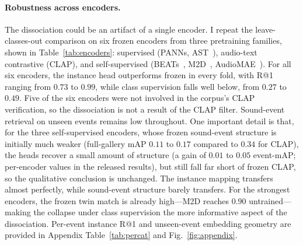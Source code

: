 \documentclass{article}
\begin{document}
\paragraph{Robustness across encoders.} The dissociation could be an artifact of a single encoder. I repeat the leave-classes-out comparison on six frozen encoders from three pretraining families, shown in Table~\ref{tab:encoders}: supervised (PANNs, AST~\citep{gong2021ast}), audio-text contrastive (CLAP), and self-supervised (BEATs~\citep{chen2023beats}, M2D~\citep{niizumi2024m2d}, AudioMAE~\citep{huang2022audiomae}). For all six encoders, the instance head outperforms frozen in every fold, with R@1 ranging from $0.73$ to $0.99$, while class supervision falls well below, from $0.27$ to $0.49$. Five of the six encoders were not involved in the corpus's CLAP verification, so the dissociation is not a result of the CLAP filter. Sound-event retrieval on unseen events remains low throughout. One important detail is that, for the three self-supervised encoders, whose frozen sound-event structure is initially much weaker (full-gallery mAP $0.11$ to $0.17$ compared to $0.34$ for CLAP), the heads recover a small amount of structure (a gain of $0.01$ to $0.05$ event-mAP; per-encoder values in the released results), but still fall far short of frozen CLAP, so the qualitative conclusion is unchanged. The instance mapping transfers almost perfectly, while sound-event structure barely transfers. For the strongest encoders, the frozen twin match is already high---M2D reaches $0.90$ untrained---making the collapse under class supervision the more informative aspect of the dissociation. Per-event instance R@1 and unseen-event embedding geometry are provided in Appendix Table~\ref{tab:percat} and Fig.~\ref{fig:appendix}.
\end{document}
